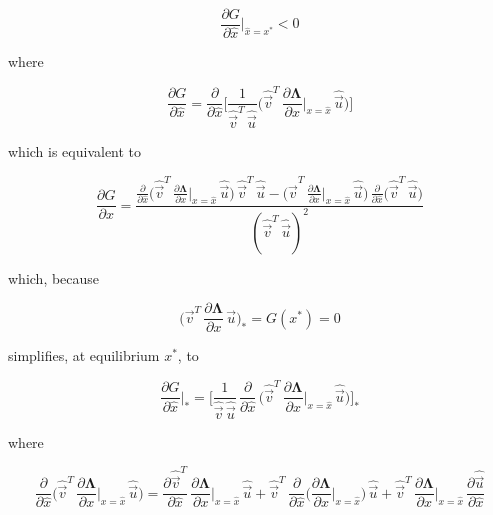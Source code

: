 \begin{equation}
    \frac{\partial G}{\partial \hat{x}}\bigg|_{\hat{x}=x^*} < 0
\end{equation}

where 

\begin{equation}
    \frac{\partial G}{\partial \hat{x}} = \frac{\partial}{\partial \hat{x}} \Bigg[ \frac{1}{\hat{\overrightarrow{v}}^T\,\hat{\overrightarrow{u}}} \bigg( \hat{\overrightarrow{v}}^T\,\frac{\partial \pmb{\Lambda}}{\partial x}\bigg|_{x=\hat{x}}\,\hat{\overrightarrow{u}} \bigg) \Bigg]
\end{equation}

which is equivalent to

\begin{equation}
    \frac{\partial G}{\partial \hat{x}} = \frac{\frac{\partial}{\partial \hat{x}} \big( \hat{\overrightarrow{v}}^T\,\frac{\partial \pmb{\Lambda}}{\partial x}\big|_{x=\hat{x}}\,\hat{\overrightarrow{u}} \big)\,\hat{\overrightarrow{v}}^T\,\hat{\overrightarrow{u}} - \big( \hat{\overrightarrow{v}}^T\,\frac{\partial \pmb{\Lambda}}{\partial x}\big|_{x=\hat{x}}\,\hat{\overrightarrow{u}} \big)\,\frac{\partial}{\partial \hat{x}} \big(\hat{\overrightarrow{v}}^T\,\hat{\overrightarrow{u}}\big)}{(\hat{\overrightarrow{v}}^T\,\hat{\overrightarrow{u}})^2}
    \label{eq:deriv_gradient}
\end{equation}

which, because

\begin{equation}
    \bigg( \overrightarrow{v}^T\,\frac{\partial \pmb \Lambda}{\partial x}\,\overrightarrow{u} \bigg)_* = G(x^*) = 0
    \label{eq:gradient_is_zero_at_equilibrium}
\end{equation}

simplifies, at equilibrium $x^*$, to

\begin{equation}
    \frac{\partial G}{\partial \hat x}\bigg|_* = \Bigg[ \frac{1}{\hat{\overrightarrow{v}}\,\hat{\overrightarrow{u}}} \, \frac{\partial}{\partial \hat x}\,\bigg(\hat{\overrightarrow{v}}^T\,\frac{\partial \pmb \Lambda}{\partial x}\bigg|_{x=\hat x}\,\hat{\overrightarrow{u}}\bigg)\Bigg]_*
    \label{eq:deriv_gradient_equilibrium}
\end{equation}

where

\begin{equation}
    \frac{\partial}{\partial \hat{x}} \bigg( \hat{\overrightarrow{v}}^T\,\frac{\partial \pmb{\Lambda}}{\partial x}\bigg|_{x=\hat{x}}\,\hat{\overrightarrow{u}} \bigg) = \frac{\partial \hat{\overrightarrow{v}}^T}{\partial \hat{x}}\,\frac{\partial \pmb{\Lambda}}{\partial x}\bigg|_{x=\hat{x}}\,\hat{\overrightarrow{u}} + \hat{\overrightarrow{v}}^T\,\frac{\partial}{\partial \hat{x}} \bigg(\frac{\partial \pmb{\Lambda}}{\partial x}\bigg|_{x=\hat{x}}\bigg)\,\hat{\overrightarrow{u}} + \hat{\overrightarrow{v}}^T\,\frac{\partial \pmb{\Lambda}}{\partial x}\bigg|_{x=\hat{x}}\,\frac{\partial \hat{\overrightarrow{u}}}{\partial \hat{x}}
\end{equation}

